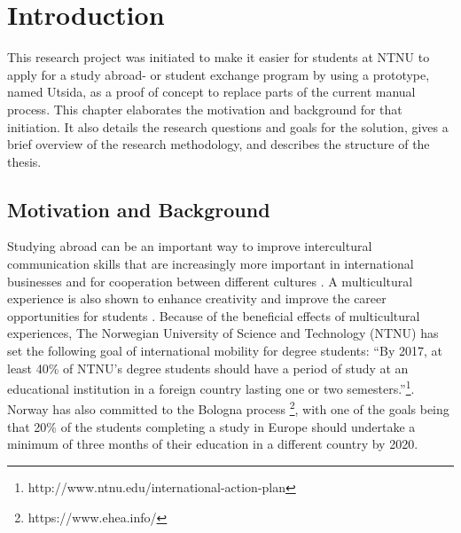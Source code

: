 
\chapter{Introduction}\label{chap:1}

This research project was initiated to make it easier for students at NTNU to apply for a study abroad- or student exchange program by using a prototype, named Utsida, as a proof of concept to replace parts of the current manual process. This chapter elaborates the motivation and background for that initiation. It also details the research questions and goals for the solution, gives a brief overview of the research methodology, and describes the structure of the thesis.

\section{Motivation and Background}
Studying abroad can be an important way to improve intercultural communication skills that are increasingly more important in international businesses and for cooperation between different cultures \cite{williams2005exploring}. A multicultural experience is also shown to enhance creativity \cite{leung2008multicultural} and improve the career opportunities for students \cite{brandenburg2014erasmus}. Because of the beneficial effects of multicultural experiences, The Norwegian University of Science and Technology (NTNU) has set the following goal of international mobility for degree students: \enquote{By 2017, at least 40\% of NTNU's degree students should have a period of study at an educational institution in a foreign country lasting one or two semesters.}\footnote{http://www.ntnu.edu/international-action-plan}. Norway has also committed to the Bologna process \footnote{https://www.ehea.info/}, with one of the goals being that 20\% of the students completing a study in Europe should undertake a minimum of three months of their education in a different country by 2020.

